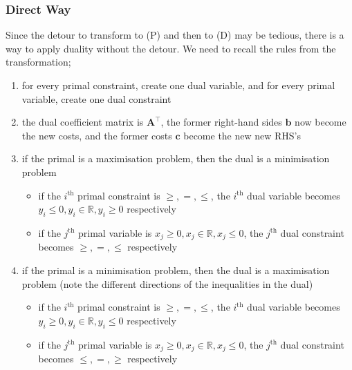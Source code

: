 \documentclass[a4paper, 12pt]{article}
\newcommand{\mat}[1]{\boldsymbol{#1}}
\renewcommand{\vec}[1]{\boldsymbol{#1}}
\begin{document}
            \subsubsection*{Direct Way}
                Since the detour to transform to (P) and then to (D) may be tedious, there is a way to apply duality without the detour.
                We need to recall the rules from the transformation;
                \begin{enumerate}[1.]
                    \itemsep0em
                    \item for every primal constraint, create one dual variable, and for every primal variable, create one dual constraint
                    \item the dual coefficient matrix is $\mat{A}^\top$, the former right-hand sides $\vec{b}$ now become the new costs, and the former costs $\vec{c}$ become the new new RHS's
                    \item if the primal is a maximisation problem, then the dual is a minimisation problem
                        \begin{itemize}
                            \itemsep0em
                            \item if the $i^\text{th}$ primal constraint is $\geq, =, \leq$, the $i^\text{th}$ dual variable becomes $y_i \leq 0, y_i \in \mathbb{R}, y_i \geq 0$ respectively
                            \item if the $j^\text{th}$ primal variable is $x_j \geq 0, x_j \in \mathbb{R}, x_j \leq 0$, the $j^\text{th}$ dual constraint becomes $\geq, =, \leq$ respectively
                        \end{itemize}
                    \item if the primal is a minimisation problem, then the dual is a maximisation problem (note the different directions of the inequalities in the dual)
                        \begin{itemize}
                            \itemsep0em
                            \item if the $i^\text{th}$ primal constraint is $\geq, =, \leq$, the $i^\text{th}$ dual variable becomes $y_i \geq 0, y_i \in \mathbb{R}, y_i \leq 0$ respectively
                            \item if the $j^\text{th}$ primal variable is $x_j \geq 0, x_j \in \mathbb{R}, x_j \leq 0$, the $j^\text{th}$ dual constraint becomes $\leq, =, \geq$ respectively
                        \end{itemize}
                \end{enumerate}
\end{document}
